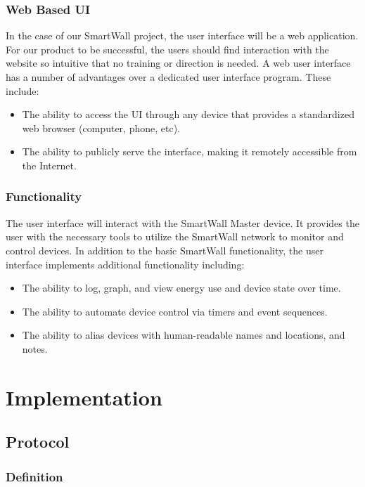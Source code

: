 \documentclass[12pt]{article}
\begin{document}
\subsubsection{Web Based UI}
In the case of our SmartWall project, the user interface will be a
web application. For our product to be successful, the users
should find interaction with the website so intuitive that no
training or direction is needed. A web user interface has a number of
advantages over a dedicated user interface program. These include:
\begin{itemize}
  \setlength{\itemsep}{0pt}
  \setlength{\parskip}{0pt}
  \setlength{\parsep}{0pt}
\item The ability to access the UI through any device that provides a
  standardized web browser (computer, phone, etc).
\item The ability to publicly serve the interface, making it
  remotely accessible from the Internet.
\end{itemize}  

\subsubsection{Functionality}
The user interface will interact with the SmartWall Master device. It
provides the user with the necessary tools to utilize the SmartWall
network to monitor and control devices. In addition to the basic
SmartWall functionality, the user interface implements additional
functionality including:
\begin{itemize}
  \setlength{\itemsep}{0pt}
  \setlength{\parskip}{0pt}
  \setlength{\parsep}{0pt}
\item The ability to log, graph, and view energy use and device state
  over time.
\item The ability to automate device control via timers and event
  sequences.
\item The ability to alias devices with human-readable names and
  locations, and notes.
\end{itemize}  

\section{Implementation}

\subsection{Protocol}

\subsubsection{Definition}
\end{document}
